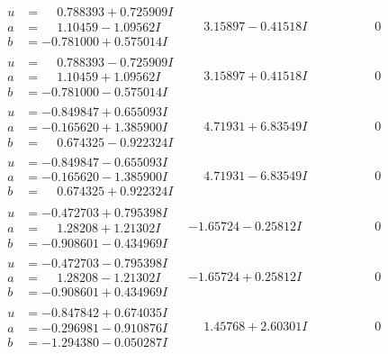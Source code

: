 \documentclass[1p]{elsarticle_modified}
\theoremstyle{definition}
\begin{document}
$$\begin{array}{c|c|c}
\begin{aligned}
u &= \phantom{-}0.788393 + 0.725909 I \\
a &= \phantom{-}1.10459 - 1.09562 I \\
b &= -0.781000 + 0.575014 I\end{aligned}
 & \phantom{-}3.15897 - 0.41518 I & \phantom{-0.000000 } 0 \\ \hline\begin{aligned}
u &= \phantom{-}0.788393 - 0.725909 I \\
a &= \phantom{-}1.10459 + 1.09562 I \\
b &= -0.781000 - 0.575014 I\end{aligned}
 & \phantom{-}3.15897 + 0.41518 I & \phantom{-0.000000 } 0 \\ \hline\begin{aligned}
u &= -0.849847 + 0.655093 I \\
a &= -0.165620 + 1.385900 I \\
b &= \phantom{-}0.674325 - 0.922324 I\end{aligned}
 & \phantom{-}4.71931 + 6.83549 I & \phantom{-0.000000 } 0 \\ \hline\begin{aligned}
u &= -0.849847 - 0.655093 I \\
a &= -0.165620 - 1.385900 I \\
b &= \phantom{-}0.674325 + 0.922324 I\end{aligned}
 & \phantom{-}4.71931 - 6.83549 I & \phantom{-0.000000 } 0 \\ \hline\begin{aligned}
u &= -0.472703 + 0.795398 I \\
a &= \phantom{-}1.28208 + 1.21302 I \\
b &= -0.908601 - 0.434969 I\end{aligned}
 & -1.65724 - 0.25812 I & \phantom{-0.000000 } 0 \\ \hline\begin{aligned}
u &= -0.472703 - 0.795398 I \\
a &= \phantom{-}1.28208 - 1.21302 I \\
b &= -0.908601 + 0.434969 I\end{aligned}
 & -1.65724 + 0.25812 I & \phantom{-0.000000 } 0 \\ \hline\begin{aligned}
u &= -0.847842 + 0.674035 I \\
a &= -0.296981 - 0.910876 I \\
b &= -1.294380 - 0.050287 I\end{aligned}
 & \phantom{-}1.45768 + 2.60301 I & \phantom{-0.000000 } 0 \\ \hline\begin{aligned}

\end{aligned}
\end{array}$$
\end{document}
